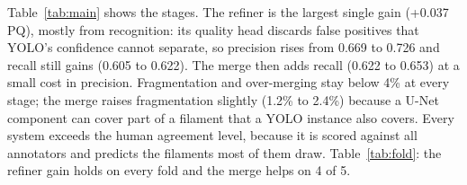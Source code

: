 \documentclass[10pt,twocolumn]{article}
\begin{document}
Table~\ref{tab:main} shows the stages. The refiner is the largest single gain (+0.037 PQ), mostly from
recognition: its quality head discards false positives that YOLO's confidence cannot separate, so
precision rises from 0.669 to 0.726 and recall still gains (0.605 to 0.622). The merge then adds recall
(0.622 to 0.653) at a small cost in precision. Fragmentation and over-merging stay below 4\% at
every stage; the merge raises fragmentation slightly (1.2\% to 2.4\%) because a U-Net component can cover
part of a filament that a YOLO instance also covers. Every system exceeds the human agreement level, because it is scored against all annotators
and predicts the filaments most of them draw. Table~\ref{tab:fold}: the refiner gain holds on every fold and the merge helps on 4 of 5.

\begin{table}[t]
\centering\small\setlength{\tabcolsep}{4pt}
\caption{OOF PQ per fold.}
\label{tab:fold}
\end{table}
\end{document}

